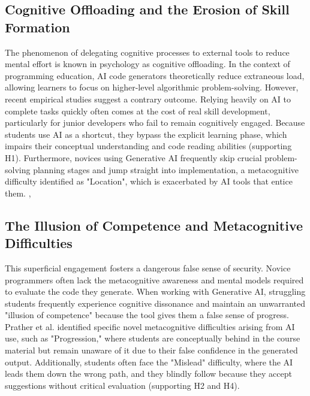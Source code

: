\documentclass[../main.tex]{subfiles}
\begin{document}
\subsection{Cognitive Offloading and the Erosion of Skill Formation}
The phenomenon of delegating cognitive processes to external tools to reduce mental effort is known in psychology as cognitive offloading. In the context of programming education, AI code generators theoretically reduce extraneous load, allowing learners to focus on higher-level algorithmic problem-solving. However, recent empirical studies suggest a contrary outcome. Relying heavily on AI to complete tasks quickly often comes at the cost of real skill development, particularly for junior developers who fail to remain cognitively engaged.
Because students use AI as a shortcut, they bypass the explicit learning phase, which impairs their conceptual understanding and code reading abilities (supporting H1).
Furthermore, novices using Generative AI frequently skip crucial problem-solving planning stages and jump straight into implementation, a metacognitive difficulty identified as "Location",
which is exacerbated by AI tools that entice them.
\cite{shen2026how}, \cite{prather2024widening}

\subsection{The Illusion of Competence and Metacognitive Difficulties}
This superficial engagement fosters a dangerous false sense of security. Novice programmers often lack the metacognitive awareness and mental models required to evaluate the code they generate.
When working with Generative AI, struggling students frequently experience cognitive dissonance and maintain an unwarranted "illusion of competence" because the tool gives them a false sense of progress.
Prather et al. identified specific novel metacognitive difficulties arising from AI use, such as "Progression," where students are conceptually behind in the course material but remain unaware of it due to their false confidence in the generated output.
Additionally, students often face the "Mislead" difficulty, where the AI leads them down the wrong path, and they blindly follow because they accept suggestions without critical evaluation (supporting H2 and H4).
\cite{prather2024widening}
\end{document}
